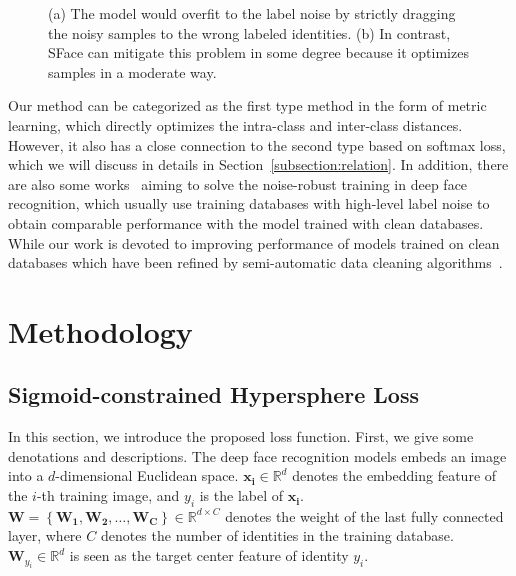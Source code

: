 \documentclass[journal,comsoc]{IEEEtran}
\begin{document}
\begin{figure}[htbp]
	\centering
	\caption{(a) The model would overfit to the label noise by strictly dragging the noisy samples to the wrong labeled identities. (b) In contrast, SFace can mitigate this problem in some degree because it optimizes samples in a moderate way.}
	\label{fig:intro_noise}
\end{figure}

Our method can be categorized as the first type method in the form of metric learning, which directly optimizes the intra-class and inter-class distances. However, it also has a close connection to the second type based on softmax loss, which we will discuss in details in Section~\ref{subsection:relation}. In addition, there are also some works~\cite{Hu_2019_CVPR,Wang_2019_ICCV} aiming to solve the noise-robust training in deep face recognition, which usually use training databases with high-level label noise to obtain comparable performance with the model trained with clean databases. While our work is devoted to improving performance of models trained on clean databases which have been refined by semi-automatic data cleaning algorithms~\cite{Yi2014CASIA,Cao18,deng2019arcface}.

\section{Methodology}
\label{sec:method}
\subsection{Sigmoid-constrained Hypersphere Loss}
In this section, we introduce the proposed loss function. First, we give some denotations and descriptions. The deep face recognition models embeds an image into a $d$-dimensional Euclidean space. $\bm{{x_i}} \in {\mathbb{R}^d}$ denotes the embedding feature of the $i$-th training image, and $y_i$ is the label of $\bm{{x_i}}$. ${\bm{W}}=\left\{ {\bm{{W_1}},\bm{{W_2}}, \ldots ,\bm{{W_C}}} \right\} \in {\mathbb{R}^{d \times C}}$ denotes the weight of the last fully connected layer, where $C$ denotes the number of identities in the training database. ${{\bm{W}_{y_i}}} \in {\mathbb{R}^{d}}$ is seen as the target center feature of identity $y_i$. 
\end{document}
